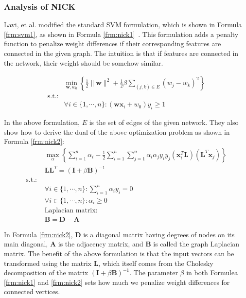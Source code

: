 \subsubsection{Analysis of NICK}
\label{sec:NICK}
Lavi, et al. modified the standard SVM formulation, which is shown in Formula \ref{frm:svm1}, as shown in Formula \ref{frm:nick1}~\cite{Lavi2012}. This formulation adds a penalty function to penalize weight differences if their corresponding features are connected in the given graph. The intuition is that if features are connected in the network, their weight should be somehow similar.

            \begin{align}
              &\min_{\mathbf{w}, w_0}\left\{\frac{1}{2}\|\mathbf{w}\|^2 + \frac{1}{2}\beta\sum_{(j,k)\in E}(w_j-w_k)^2\right\} \nonumber \\
              \text{s.t.:} & \nonumber \\
              &\forall i \in \{1,\cdots,n\} : (\mathbf{w}\mathbf{x}_i+w_0)y_i\geq 1
            \label{frm:nick1}
            \end{align}
          
In the above formulation, $E$ is the set of edges of the given network. They also show how to derive the dual of the above optimization problem as shown in Formula \ref{frm:nick2}:
\begin{align}
  &\max_\alpha\left\{\sum_{i=1}^n\alpha_i-\frac{1}{2}\sum_{i=1}^n\sum_{j=1}^n\alpha_i\alpha_j y_i y_j (\mathbf{x}_i^T\mathbf{L})(\mathbf{L}^T\mathbf{x}_j)\right\} \nonumber \\
  &\mathbf{L}\mathbf{L}^T=(\mathbf{I}+\beta \mathbf{B})^{-1} \nonumber \\
  \text{s.t.: }& \nonumber \\
  &\forall i \in \{1,\cdots,n\}: \sum_{i=1}^n\alpha_iy_i=0\nonumber \\
  &\forall i \in \{1,\cdots,n\}: \alpha_i \geq 0 \nonumber \\
  &\text{Laplacian matrix:} \nonumber \\
  & \mathbf{B} = \mathbf{D} - \mathbf{A}
  \label{frm:nick2}
\end{align}

In Formula \ref{frm:nick2}, $\mathbf{D}$ is a diagonal matrix having degrees of nodes on its main diagonal, $\mathbf{A}$ is the adjacency matrix, and $\mathbf{B}$ is called the graph Laplacian matrix. The benefit of the above formulation is that the input vectors can be transformed using the matrix $\mathbf{L}$, which itself comes from the Cholesky decomposition of the matrix $(\mathbf{I} + \beta \mathbf{B})^{-1}$. The parameter $\beta$ in both Formulea \ref{frm:nick1} and \ref{frm:nick2} sets how much we penalize weight differences for connected vertices.

